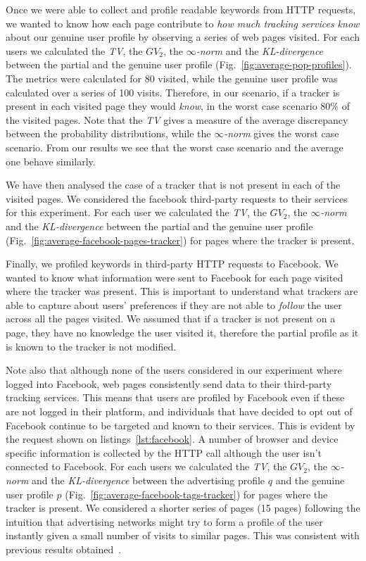 Once we were able to collect and profile readable keywords from HTTP requests, we wanted to know how each page contribute to \emph{how much tracking services know} about our genuine user profile by observing a series of web pages visited.
For each users we calculated the \emph{TV}, the \emph{$GV_2$}, the \emph{$\infty$-norm} and the \emph{KL-divergence} between the partial and the genuine user profile (Fig.~\ref{fig:average-pop-profiles}).
The metrics were calculated for 80 visited, while the genuine user profile was calculated over a series of 100 visits. Therefore, in our scenario, if a tracker is present in each visited page they would \emph{know}, in the worst case scenario 80\% of the visited pages.
Note that the \emph{TV} gives a measure of the average discrepancy between the probability distributions, while the \emph{$\infty$-norm} gives the worst case scenario. From our results we see that the worst case scenario and the average one behave similarly.

We have then analysed the case of a tracker that is not present in each of the visited pages. We considered the facebook third-party requests to their services for this experiment. For each user we calculated the \emph{TV}, the \emph{$GV_2$}, the \emph{$\infty$-norm} and the \emph{KL-divergence} between the partial and the genuine user profile (Fig.~\ref{fig:average-facebook-pages-tracker}) for pages where the tracker is present.

Finally, we profiled keywords in third-party HTTP requests to Facebook. We wanted to know what information were sent to Facebook for each page visited where the tracker was present. This is important to understand what trackers are able to capture about users’ preferences if they are not able to \emph{follow} the user across all the pages visited. We assumed that if a tracker is not present on a page, they have no knowledge the user visited it, therefore the partial profile as it is known to the tracker is not modified.

Note also that although none of the users considered in our experiment where logged into Facebook, web pages consistently send data to their third-party tracking services. This means that users are profiled by Facebook even if these are not logged in their platform, and individuals that have decided to opt out of Facebook continue to be targeted and known to their services. This is evident by the request shown on listings~\ref{lst:facebook}. A number of browser and device specific information is collected by the HTTP call although the user isn't connected to Facebook. For each users we calculated the \emph{TV}, the \emph{$GV_2$}, the \emph{$\infty$-norm} and the \emph{KL-divergence} between the advertising profile $q$ and the genuine user profile $p$ (Fig.~\ref{fig:average-facebook-tags-tracker}) for pages where the tracker is present. We considered a shorter series of pages (15 pages) following the intuition that advertising networks might try to form a profile of the user instantly given a small number of visits to similar pages. This was consistent with previous results obtained~\cite{puglisi2015you}.

